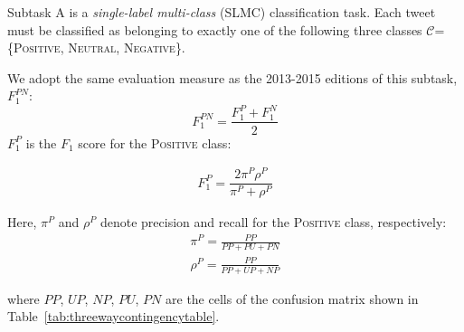 \documentclass[11pt,letterpaper]{article}
\begin{document}
\noindent Subtask A is a {\em single-label multi-class} (SLMC) classification task. Each tweet must be classified as belonging to
exactly one of the following three classes
$\mathcal{C}$=\{\textsc{Positive}, \textsc{Neutral},
\textsc{Negative}\}.

We adopt the same evaluation measure as the 2013-2015 editions of this subtask,
$F_{1}^{PN}$:
%
\begin{equation}\label{eq:F1PN}F_{1}^{PN}=\frac{F_{1}^{P}+F_{1}^{N}}{2}\end{equation}
%
\noindent $F_{1}^{P}$
is the $F_{1}$ score for the \textsc{Positive} class:

\begin{equation}
  \begin{aligned}
    \label{eq:f1pos}
    F_{1}^{P}=\dfrac{2\pi^{P}\rho^{P}}{\pi^{P}+\rho^{P}}
  \end{aligned}
\end{equation}

\noindent Here, $\pi^{P}$ and $\rho^{P}$ denote precision and recall
for the \textsc{Positive} class, respectively:
\begin{equation}
  \begin{aligned}
    \label{eq:pipos}
    \pi^{P} =\frac{PP}{PP+PU+PN}
  \end{aligned}
\end{equation}
%
%
\begin{equation}
  \begin{aligned}
    \label{eq:rhopos}
    \rho^{P} =\frac{PP}{PP+UP+NP}
  \end{aligned}
\end{equation}

\noindent where $PP$, $UP$, $NP$, $PU$, $PN$ are the cells of the
confusion matrix shown in Table~\ref{tab:threewaycontingencytable}.
\end{document}
